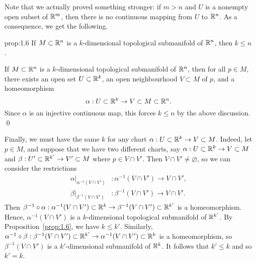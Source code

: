 Note that we actually proved something stronger: if $m > n$ and $U$ is a 
nonempty open subset of $\mathbb{R}^m$, then there is no continuous mapping from 
$U$ to $\mathbb{R}^n$. As a consequence, we get the following. 
\begin{prop}{prop:1.6}
    If $M \subset \mathbb{R}^n$ is a $k$-dimensional topological submanifold of 
    $\mathbb{R}^n$, then $k \leq n$. 
\end{prop}\vspace{-0.25cm}
\begin{pf}
    If $M \subset \mathbb{R}^n$ is a $k$-dimensional topological submanifold of $\mathbb{R}^n$, 
    then for all $p \in M$, there exists an open set $U \subset \mathbb{R}^k$, 
    an open neighbourhood $V \subset M$ of $p$, and a homeomorphism
    \[ \alpha : U \subset \mathbb{R}^k \to V \subset M \subset \mathbb{R}^n. \] 
    Since $\alpha$ is an injective continuous map, this forces $k \leq n$ 
    by the above discussion. \qed
\end{pf}\vspace{-0.25cm}
Finally, we must have the same $k$ for any chart $\alpha : U \subset \mathbb{R}^k 
\to V \subset M$. Indeed, let $p \in M$, and suppose that we have two 
different charts, say $\alpha : U \subset \mathbb{R}^k \to V \subset M$ and 
$\beta : U' \subset \mathbb{R}^{k'} \to V' \subset M$ where $p \in V \cap V'$. 
Then $V \cap V' \neq \varnothing$, so we can consider the restrictions 
\begin{align*}
    \alpha|_{\alpha^{-1}(V \cap V')} &: \alpha^{-1}(V \cap V') \to V \cap V', \\
    \beta|_{\beta^{-1}(V \cap V')} &: \beta^{-1}(V \cap V') \to V \cap V'.
\end{align*} 
Then $\beta^{-1} \circ \alpha : \alpha^{-1}(V \cap V') \subset \mathbb{R}^k 
\to \beta^{-1}(V \cap V') \subset \mathbb{R}^{k'}$ is a homeomorphism. Hence, 
$\alpha^{-1}(V \cap V')$ is a $k$-dimensional topological submanifold
of $\mathbb{R}^{k'}$. By Proposition~\ref{prop:1.6}, we have $k \leq k'$. 
Similarly, $\alpha^{-1} \circ \beta : \beta^{-1}(V \cap V') \subset 
\mathbb{R}^{k'} \to \alpha^{-1}(V \cap V') \subset \mathbb{R}^k$ is a homeomorphism, so 
$\beta^{-1}(V \cap V')$ is a $k'$-dimensional submanifold of $\mathbb{R}^k$. 
It follows that $k' \leq k$ and so $k' = k$. 


